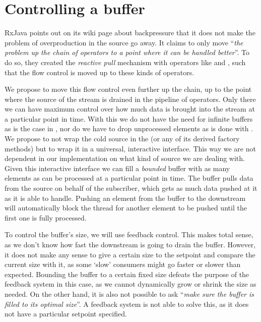 \section{Controlling a buffer}
RxJava points out on its wiki page \cite{RxJava-Wiki-Backpressure} about backpressure that it does not make the problem of overproduction in the source go away. It claims to only move ``\textit{the problem up the chain of operators to a point where it can be handled better}''. To do so, they created the \textit{reactive pull} mechanism with operators like  and , such that the flow control is moved up to these kinds of operators.

We propose to move this flow control even further up the chain, up to the point where the source of the stream is drained in the pipeline of operators. Only there we can have maximum control over how much data is brought into the stream at a particular point in time. With this we do not have the need for infinite buffers as is the case in , nor do we have to drop unprocessed elements as is done with . We propose to not wrap the cold source in the  (or any of its derived factory methods) but to wrap it in a universal, interactive interface. This way we are not dependent in our implementation on what kind of source we are dealing with. Given this interactive interface we can fill a \textit{bounded} buffer with as many elements as can be processed at a particular point in time. The buffer pulls data from the source on behalf of the subscriber, which gets as much data pushed at it as it is able to handle. Pushing an element from the buffer to the downstream will automatically block the thread for another element to be pushed until the first one is fully processed.

To control the buffer's size, we will use feedback control. This makes total sense, as we don't know how fast the downstream is going to drain the buffer. However, it does not make any sense to give a certain size to the setpoint and compare the current size with it, as some `slow' consumers might go faster or slower than expected. Bounding the buffer to a certain fixed size defeats the purpose of the feedback system in this case, as we cannot dynamically grow or shrink the size as needed. On the other hand, it is also not possible to ask ``\textit{make sure the buffer is filled to its optimal size}''. A feedback system is not able to solve this, as it does not have a particular setpoint specified.


